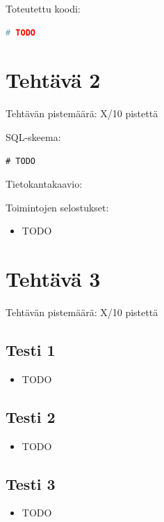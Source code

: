 \documentclass[a4paper,11pt]{article}
\begin{document}
Toteutettu koodi:

\begin{lstlisting}[language=Python]
# TODO
\end{lstlisting}

\section*{Tehtävä 2}

Tehtävän pistemäärä: X/10 pistettä

SQL-skeema:

\begin{lstlisting}[language=SQL]
# TODO
\end{lstlisting}

Tietokantakaavio:


Toimintojen selostukset:

\begin{itemize}
\item TODO
\end{itemize}

\section*{Tehtävä 3}

Tehtävän pistemäärä: X/10 pistettä

\subsection*{Testi 1}

\begin{itemize}
\item TODO
\end{itemize}

\subsection*{Testi 2}

\begin{itemize}
\item TODO
\end{itemize}

\subsection*{Testi 3}

\begin{itemize}
\item TODO
\end{itemize}
\end{document}
